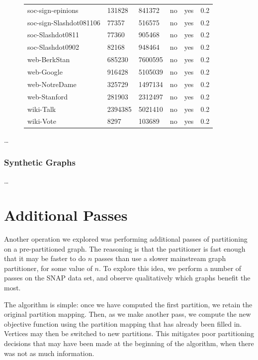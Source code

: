 \documentclass[11pt]{article}
\begin{document}
\begin{figure}
{\begin{tabular}{ *6l }
soc-sign-epinions & 131828 & 841372 & no & yes & 0.2\\ 
soc-sign-Slashdot081106 & 77357 & 516575 & no & yes & 0.2\\ 
soc-Slashdot0811 & 77360 & 905468 & no & yes & 0.2\\ 
soc-Slashdot0902 & 82168 & 948464 & no & yes & 0.2\\ 
web-BerkStan & 685230 & 7600595 & no & yes & 0.2\\ 
web-Google & 916428 & 5105039 & no & yes & 0.2\\ 
web-NotreDame & 325729 & 1497134 & no & yes & 0.2\\ 
web-Stanford & 281903 & 2312497 & no & yes & 0.2\\ 
wiki-Talk & 2394385 & 5021410 & no & yes & 0.2\\ 
wiki-Vote  & 8297 & 103689 & no & yes & 0.2\\ 
 \hline
\end{tabular}\par
}
\end{figure}

\dots

\subsubsection{Synthetic Graphs}
\dots

\section{Additional Passes}
Another operation we explored was performing additional passes of partitioning on a pre-partitioned graph. The reasoning is that the partitioner is fast enough that it may be faster to do $n$ passes than use a slower mainstream graph partitioner, for some value of $n$. To explore this idea, we perform a number of passes on the SNAP data set, and observe qualitatively which graphs benefit the most. 

The algorithm is simple: once we have computed the first partition, we retain the original partition mapping. Then, as we make another pass, we compute the new objective function using the partition mapping that has already been filled in. Vertices may then be switched to new partitions. This mitigates poor partitioning decisions that may have been made at the beginning of the algorithm, when there was not as much information. 



\end{document}
